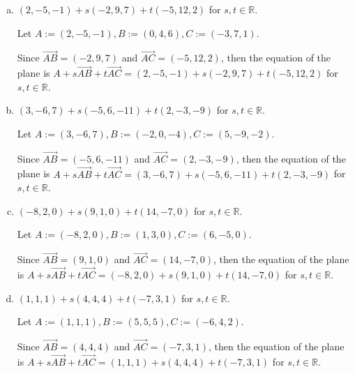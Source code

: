 \begin{Exercise}
	\begin{enumerate}[(a)]
		\item 
		\begin{answer}
			$(2,-5,-1)+s(-2,9,7)+t(-5,12,2)$ for $s,t\in\mathbb{R}$.
		\end{answer}
		\begin{solution}
			Let $A := (2,-5,-1), B := (0,4,6), C := (-3,7,1)$.
			
			Since $\overrightarrow{AB} = (-2,9,7)$ and $\overrightarrow{AC} = (-5,12,2)$, then the equation of the plane is $A+s\overrightarrow{AB}+t\overrightarrow{AC} = (2,-5,-1)+s(-2,9,7)+t(-5,12,2)$ for $s,t\in\mathbb{R}$.
		\end{solution}
		
		\item 
		\begin{answer}
			$(3,-6,7)+s(-5,6,-11)+t(2,-3,-9)$ for $s,t\in\mathbb{R}$.
		\end{answer}
		\begin{solution}
			Let $A := (3,-6,7), B := (-2,0,-4), C := (5,-9,-2)$.
			
			Since $\overrightarrow{AB} = (-5,6,-11)$ and $\overrightarrow{AC} = (2,-3,-9)$, then the equation of the plane is $A+s\overrightarrow{AB}+t\overrightarrow{AC} = (3,-6,7)+s(-5,6,-11)+t(2,-3,-9)$ for $s,t\in\mathbb{R}$.
		\end{solution}
		
		\item 
		\begin{answer}
			$(-8,2,0)+s(9,1,0)+t(14,-7,0)$ for $s,t\in\mathbb{R}$.
		\end{answer}
		\begin{solution}
			Let $A := (-8,2,0), B := (1,3,0), C := (6,-5,0)$.
			
			Since $\overrightarrow{AB} = (9,1,0)$ and $\overrightarrow{AC} = (14,-7,0)$, then the equation of the plane is $A+s\overrightarrow{AB}+t\overrightarrow{AC} = (-8,2,0)+s(9,1,0)+t(14,-7,0)$ for $s,t\in\mathbb{R}$.
		\end{solution}
		
		\item 
		\begin{answer}
			$(1,1,1)+s(4,4,4)+t(-7,3,1)$ for $s,t\in\mathbb{R}$.
		\end{answer}
		\begin{solution}
			Let $A := (1,1,1), B := (5,5,5), C := (-6,4,2)$.
			
			Since $\overrightarrow{AB} = (4,4,4)$ and $\overrightarrow{AC} = (-7,3,1)$, then the equation of the plane is $A+s\overrightarrow{AB}+t\overrightarrow{AC} = (1,1,1)+s(4,4,4)+t(-7,3,1)$ for $s,t\in\mathbb{R}$.
		\end{solution}
	\end{enumerate}
\end{Exercise}